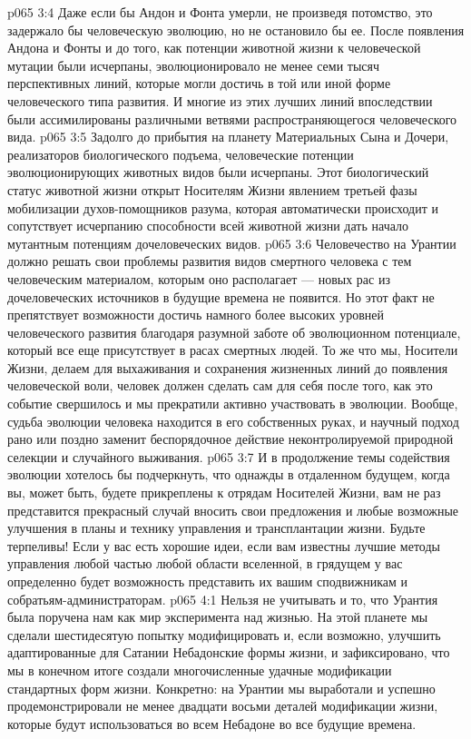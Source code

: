 \vs p065 3:4 \pc Даже если бы Андон и Фонта умерли, не произведя потомство, это задержало бы человеческую эволюцию, но не остановило бы ее. После появления Андона и Фонты и до того, как потенции животной жизни к человеческой мутации были исчерпаны, эволюционировало не менее семи тысяч перспективных линий, которые могли достичь в той или иной форме человеческого типа развития. И многие из этих лучших линий впоследствии были ассимилированы различными ветвями распространяющегося человеческого вида.
\vs p065 3:5 Задолго до прибытия на планету Материальных Сына и Дочери, реализаторов биологического подъема, человеческие потенции эволюционирующих животных видов были исчерпаны. Этот биологический статус животной жизни открыт Носителям Жизни явлением третьей фазы мобилизации духов\hyp{}помощников разума, которая автоматически происходит и сопутствует исчерпанию способности всей животной жизни дать начало мутантным потенциям дочеловеческих видов.
\vs p065 3:6 \pc Человечество на Урантии должно решать свои проблемы развития видов смертного человека с тем человеческим материалом, которым оно располагает --- новых рас из дочеловеческих источников в будущие времена не появится. Но этот факт не препятствует возможности достичь намного более высоких уровней человеческого развития благодаря разумной заботе об эволюционном потенциале, который все еще присутствует в расах смертных людей. То же что мы, Носители Жизни, делаем для выхаживания и сохранения жизненных линий до появления человеческой воли, человек должен сделать сам для себя после того, как это событие свершилось и мы прекратили активно участвовать в эволюции. Вообще, судьба эволюции человека находится в его собственных руках, и научный подход рано или поздно заменит беспорядочное действие неконтролируемой природной селекции и случайного выживания.
\vs p065 3:7 И в продолжение темы содействия эволюции хотелось бы подчеркнуть, что однажды в отдаленном будущем, когда вы, может быть, будете прикреплены к отрядам Носителей Жизни, вам не раз представится прекрасный случай вносить свои предложения и любые возможные улучшения в планы и технику управления и трансплантации жизни. Будьте терпеливы! Если у вас есть хорошие идеи, если вам известны лучшие методы управления любой частью любой области вселенной, в грядущем у вас определенно будет возможность представить их вашим сподвижникам и собратьям\hyp{}администраторам.
\vs p065 4:1 Нельзя не учитывать и то, что Урантия была поручена нам как мир эксперимента над жизнью. На этой планете мы сделали шестидесятую попытку модифицировать и, если возможно, улучшить адаптированные для Сатании Небадонские формы жизни, и зафиксировано, что мы в конечном итоге создали многочисленные удачные модификации стандартных форм жизни. Конкретно: на Урантии мы выработали и успешно продемонстрировали не менее двадцати восьми деталей модификации жизни, которые будут использоваться во всем Небадоне во все будущие времена.
